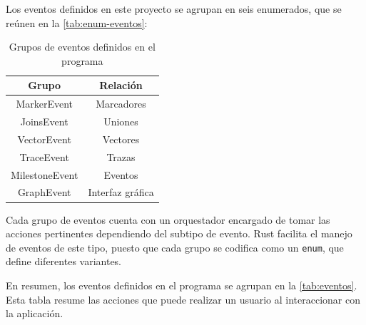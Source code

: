 Los eventos definidos en este proyecto se agrupan en seis enumerados, que se reúnen en la \autoref{tab:enum-eventos}:

\begin{table}[H]
  \centering
  \begin{tabular}{c|c}
  \toprule
  {\textbf{Grupo}} & {\textbf{Relación}} \\
  \midrule
  MarkerEvent & Marcadores \\
  JoinsEvent & Uniones \\
  VectorEvent & Vectores \\
  TraceEvent & Trazas \\
  MilestoneEvent & Eventos \\
  GraphEvent & Interfaz gráfica \\
  \bottomrule
  \end{tabular}
  \caption{Grupos de eventos definidos en el programa}
  \label{tab:enum-eventos}
\end{table}

Cada grupo de eventos cuenta con un orquestador encargado de tomar las acciones pertinentes dependiendo del subtipo de evento. Rust facilita el manejo de eventos de este tipo, puesto que cada grupo se codifica como un \texttt{enum}, que define diferentes variantes.

En resumen, los eventos definidos en el programa se agrupan en la \autoref{tab:eventos}. Esta tabla resume las acciones que puede realizar un usuario al interaccionar con la aplicación.

